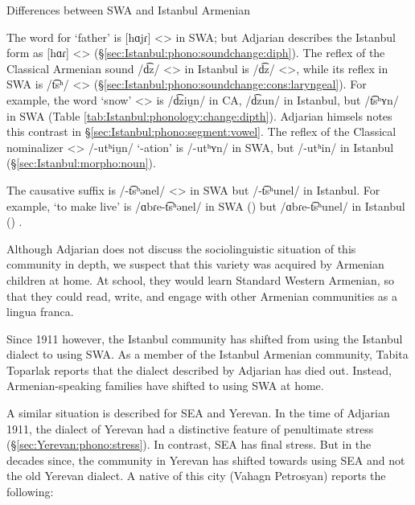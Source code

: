 \begin{exe}
	\ex Differences between SWA and Istanbul Armenian
	\begin{xlist}
		\ex The word for `father' is [hɑjɾ] <> in SWA; but Adjarian describes the Istanbul form as [hɑɾ] <> (\S\ref{sec:Istanbul:phono:soundchange:diph}).
		\ex The reflex of the Classical Armenian sound /d͡z/ <> in Istanbul is /d͡z/ <>, while its reflex in SWA is /t͡sʰ/ <> (\S\ref{sec:Istanbul:phono:soundchange:cons:laryngeal}). For example, the word `snow' <> is /d͡ziu̯n/ in CA, /d͡zun/ in Istanbul, but /t͡sʰʏn/ in SWA (Table \ref{tab:Istanbul:phonology:change:dipth}). Adjarian himsels notes this contrast in \S\ref{sec:Istanbul:phono:segment:vowel}. 
		\ex The reflex of the Classical nominalizer <> /-utʰiu̯n/ `-ation' is /-utʰʏn/ in SWA, but /-utʰin/ in Istanbul (\S\ref{sec:Istanbul:morpho:noun}). 
		\item The causative suffix is /-t͡sʰənel/ <> in SWA but /-t͡sʰunel/ in Istanbul. For example, `to make live' is /ɑbɾe-t͡sʰənel/ in SWA () but /ɑbɾe-t͡sʰunel/ in Istanbul () \citep[140]{Adjarian-1941-IstanbulDialect}. 
	\end{xlist}
\end{exe}






Although Adjarian does not discuss the sociolinguistic situation of this community in depth, we suspect that this variety was acquired by Armenian children at home. At school, they would learn Standard Western Armenian, so that they could read, write, and engage with other Armenian communities as a lingua franca. 

Since 1911 however, the Istanbul community has shifted from using the Istanbul dialect to using SWA. As a member of the Istanbul Armenian community, Tabita Toparlak reports that the dialect described by Adjarian has died out. Instead, Armenian-speaking families have shifted to using SWA at home. 




A similar situation is described for SEA and Yerevan. In the time of Adjarian 1911, the dialect of Yerevan had a distinctive feature of penultimate stress (\S\ref{sec:Yerevan:phono:stress}). In contrast, SEA has final stress. But in the decades since, the community in Yerevan has shifted towards using SEA and not the old Yerevan dialect. A native of this city (Vahagn Petrosyan) reports the following:

